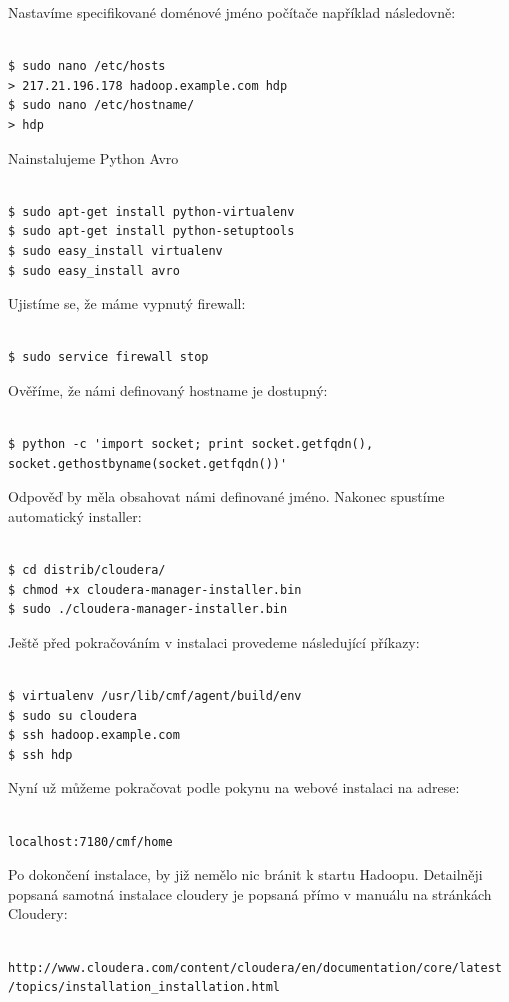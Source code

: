 \documentclass[thesis=M,czech]{FITthesis}[2012/06/26]
\begin{document}
Nastavíme specifikované doménové jméno počítače například následovně:
\begin{lstlisting}[frame=single]  % Start your code-block

$ sudo nano /etc/hosts
> 217.21.196.178 hadoop.example.com hdp
$ sudo nano /etc/hostname/
> hdp
\end{lstlisting}

Nainstalujeme Python Avro
\begin{lstlisting}[frame=single]  % Start your code-block

$ sudo apt-get install python-virtualenv
$ sudo apt-get install python-setuptools
$ sudo easy_install virtualenv
$ sudo easy_install avro
\end{lstlisting}
Ujistíme se, že máme vypnutý firewall:
\begin{lstlisting}[frame=single]  % Start your code-block

$ sudo service firewall stop
\end{lstlisting}
Ověříme, že námi definovaný hostname je dostupný:
\begin{lstlisting}[frame=single]  % Start your code-block

$ python -c 'import socket; print socket.getfqdn(), socket.gethostbyname(socket.getfqdn())'
\end{lstlisting}
Odpověď by měla obsahovat námi definované jméno.
Nakonec spustíme automatický installer:
\begin{lstlisting}[frame=single]  % Start your code-block

$ cd distrib/cloudera/
$ chmod +x cloudera-manager-installer.bin
$ sudo ./cloudera-manager-installer.bin
\end{lstlisting}

Ještě před pokračováním v instalaci provedeme následující příkazy:
\begin{lstlisting}[frame=single]  % Start your code-block

$ virtualenv /usr/lib/cmf/agent/build/env
$ sudo su cloudera
$ ssh hadoop.example.com
$ ssh hdp
\end{lstlisting}

Nyní už můžeme pokračovat podle pokynu na webové instalaci na adrese:
\begin{lstlisting}[frame=single]  % Start your code-block

localhost:7180/cmf/home
\end{lstlisting}

Po dokončení instalace, by již nemělo nic bránit k startu Hadoopu. Detailněji popsaná samotná instalace cloudery je popsaná přímo v manuálu na stránkách Cloudery:
\begin{lstlisting}[frame=single]  % Start your code-block

http://www.cloudera.com/content/cloudera/en/documentation/core/latest /topics/installation_installation.html
\end{lstlisting}
\end{document}
